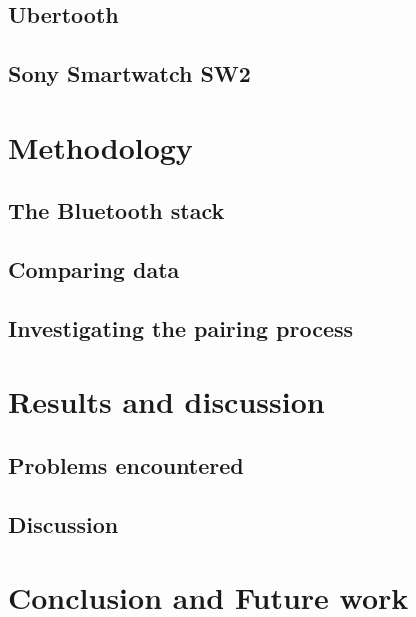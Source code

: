 \documentclass{article}
\begin{document}
	\subsection{Ubertooth}
	\subsection{Sony Smartwatch SW2} %
	
\newpage
\section{Methodology}		%
 
	\subsection{The Bluetooth stack}
				
		
	\subsection{Comparing data}	%
		
	
	\subsection{Investigating the pairing process}
		
\newpage
\section{Results and discussion}

		
		\subsection{Problems encountered}
		
		\subsection{Discussion}
		
\newpage
\section{Conclusion and Future work}

\end{document}
